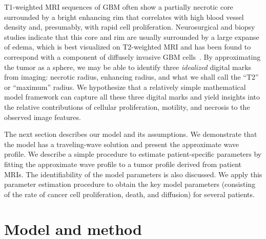 \documentclass{aims}
\numberwithin{equation}{section}
\begin{document}
T1-weighted MRI sequences of GBM often show a partially necrotic core
surrounded by a bright enhancing rim that correlates with high blood vessel
density and, presumably, with rapid cell proliferation. Neurosurgical and biopsy
studies indicate that this core and
rim are usually surrounded by a large expanse of edema, which is best visualized
on T2-weighted MRI and has been found to correspond with a component of diffusely
invasive GBM cells~\cite{Claes2007}.  By approximating the tumor as a sphere, we
may be able to identify three \emph{idealized} digital marks from imaging:
necrotic radius, enhancing radius, and what we shall call the ``T2'' or
``maximum'' radius.  We hypothesize that a relatively simple mathematical model
framework can capture all these three digital marks and yield insights into the
relative contributions of cellular proliferation, motility, and necrosis to the
observed image features.

The next section describes our model and its
assumptions.  We demonstrate that the model has a traveling-wave solution
and present the approximate wave profile.  We describe a simple procedure to
estimate patient-specific parameters by fitting the approximate wave profile to a
tumor profile derived from patient MRIs. The identifiability of the model
parameters is also discussed. We apply this parameter estimation procedure to
obtain the key model parameters (consisting of the rate of cancer
cell proliferation, death, and diffusion) for several patients.


\section{Model and method}
\end{document}
